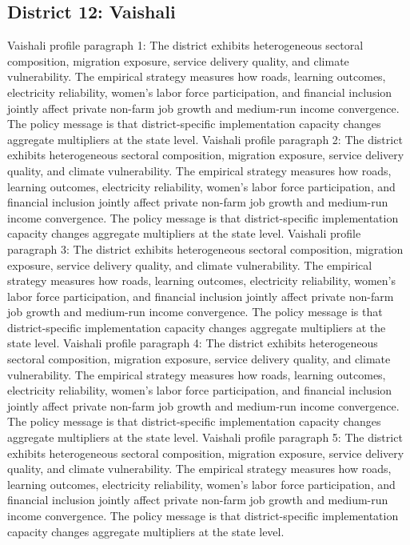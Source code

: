 \documentclass[preprint,12pt]{elsarticle}
\begin{document}
\subsection{District 12: Vaishali}
Vaishali profile paragraph 1: The district exhibits heterogeneous sectoral composition, migration exposure, service delivery quality, and climate vulnerability. The empirical strategy measures how roads, learning outcomes, electricity reliability, women's labor force participation, and financial inclusion jointly affect private non-farm job growth and medium-run income convergence. The policy message is that district-specific implementation capacity changes aggregate multipliers at the state level.
Vaishali profile paragraph 2: The district exhibits heterogeneous sectoral composition, migration exposure, service delivery quality, and climate vulnerability. The empirical strategy measures how roads, learning outcomes, electricity reliability, women's labor force participation, and financial inclusion jointly affect private non-farm job growth and medium-run income convergence. The policy message is that district-specific implementation capacity changes aggregate multipliers at the state level.
Vaishali profile paragraph 3: The district exhibits heterogeneous sectoral composition, migration exposure, service delivery quality, and climate vulnerability. The empirical strategy measures how roads, learning outcomes, electricity reliability, women's labor force participation, and financial inclusion jointly affect private non-farm job growth and medium-run income convergence. The policy message is that district-specific implementation capacity changes aggregate multipliers at the state level.
Vaishali profile paragraph 4: The district exhibits heterogeneous sectoral composition, migration exposure, service delivery quality, and climate vulnerability. The empirical strategy measures how roads, learning outcomes, electricity reliability, women's labor force participation, and financial inclusion jointly affect private non-farm job growth and medium-run income convergence. The policy message is that district-specific implementation capacity changes aggregate multipliers at the state level.
Vaishali profile paragraph 5: The district exhibits heterogeneous sectoral composition, migration exposure, service delivery quality, and climate vulnerability. The empirical strategy measures how roads, learning outcomes, electricity reliability, women's labor force participation, and financial inclusion jointly affect private non-farm job growth and medium-run income convergence. The policy message is that district-specific implementation capacity changes aggregate multipliers at the state level.
\end{document}
